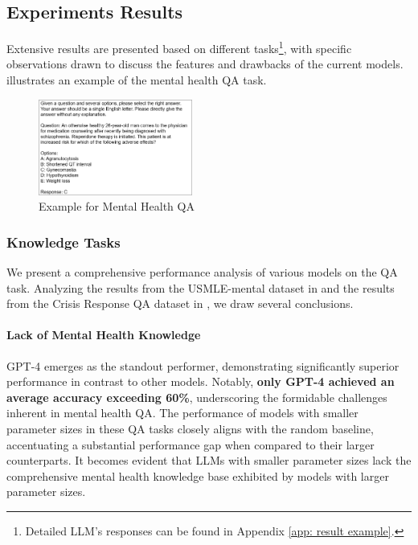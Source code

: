 \subsection{Experiments Results}
Extensive results are presented based on different tasks\footnote{Detailed LLM’s responses can be found in Appendix \ref{app: result example}.}, with specific observations drawn to discuss the features and drawbacks of the current models.  illustrates an example of the mental health QA task.

\begin{figure}[htpb]
    \centering
    \includegraphics[width=0.45\textwidth]{Figure/Mental_Health_QA.png}
    \caption{Example for Mental Health QA}
    \label{fig: mental health QA}
\end{figure}

\subsubsection{Knowledge Tasks} We present a comprehensive performance analysis of various models on the QA task. Analyzing the results from the USMLE-mental dataset in  and the results from the Crisis Response QA dataset in , we draw several conclusions.

\paragraph{Lack of Mental Health Knowledge} GPT-4 emerges as the standout performer, demonstrating significantly superior performance in contrast to other models. Notably, \textbf{only GPT-4 achieved an average accuracy exceeding 60\%}, underscoring the formidable challenges inherent in mental health QA. The performance of models with smaller parameter sizes in these QA tasks closely aligns with the random baseline, accentuating a substantial performance gap when compared to their larger counterparts. It becomes evident that LLMs with smaller parameter sizes lack the comprehensive mental health knowledge base exhibited by models with larger parameter sizes. 

